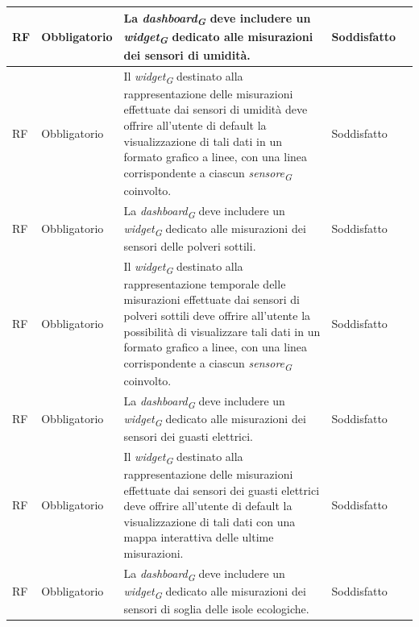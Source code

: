 \begin{longtable}{|C{1.5cm}|C{2cm}|L{5cm}|C{2cm}|C{1.5cm}|}
    \hline
     RF & Obbligatorio & La \textit{dashboard}\textsubscript{\textit{G}} deve includere un \textit{widget}\textsubscript{\textit{G}} dedicato alle misurazioni dei sensori di umidità.& Soddisfatto \\
    \hline
     RF & Obbligatorio &Il \textit{widget}\textsubscript{\textit{G}} destinato alla rappresentazione delle misurazioni effettuate dai sensori di umidità deve offrire all'utente di default la visualizzazione di tali dati in un formato grafico a linee, con una linea corrispondente a ciascun \textit{sensore}\textsubscript{\textit{G}} coinvolto.& Soddisfatto \\
    
    \hline
     RF & Obbligatorio & La \textit{dashboard}\textsubscript{\textit{G}} deve includere un \textit{widget}\textsubscript{\textit{G}} dedicato alle misurazioni dei sensori delle polveri sottili.& Soddisfatto \\
    
    \hline
     RF & Obbligatorio &Il \textit{widget}\textsubscript{\textit{G}} destinato alla rappresentazione temporale delle misurazioni effettuate dai sensori di polveri sottili deve offrire all'utente la possibilità di visualizzare tali dati in un formato grafico a linee, con una linea corrispondente a ciascun \textit{sensore}\textsubscript{\textit{G}} coinvolto.& Soddisfatto \\
    
    \hline
     RF & Obbligatorio & La \textit{dashboard}\textsubscript{\textit{G}} deve includere un \textit{widget}\textsubscript{\textit{G}} dedicato alle misurazioni dei sensori dei guasti elettrici.& Soddisfatto \\
    
    \hline
     RF & Obbligatorio &Il \textit{widget}\textsubscript{\textit{G}} destinato alla rappresentazione delle misurazioni effettuate dai sensori dei guasti elettrici deve offrire all'utente di default la visualizzazione di tali dati con una mappa interattiva delle ultime misurazioni.  & Soddisfatto \\
    
    \hline
     RF & Obbligatorio & La \textit{dashboard}\textsubscript{\textit{G}} deve includere un \textit{widget}\textsubscript{\textit{G}} dedicato alle misurazioni dei sensori di soglia delle isole ecologiche.& Soddisfatto \\
    

\end{longtable}
